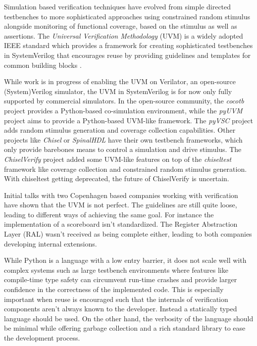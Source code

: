 \documentclass[11pt]{article}
\begin{document}
Simulation based verification techniques have evolved from simple directed testbenches to more sophisticated approaches using constrained random stimulus alongside monitoring of functional coverage, based on the stimulus as well as assertions. 
The \textit{Universal Verification Methodology} (UVM) is a widely adopted IEEE standard which provides a framework for creating sophisticated testbenches in SystemVerilog that encourages reuse by providing guidelines and templates for common building blocks \cite{flake2020a}. 

While work is in progress of enabling the UVM on Verilator, an open-source (System)Verilog simulator, the UVM in SystemVerilog is for now only fully supported by commercial simulators.
In the open-source community, the \textit{cocotb} project provides a Python-based co-simulation environment, while the \textit{pyUVM} project aims to provide a Python-based UVM-like framework. The \textit{pyVSC} project adds random stimulus generation and coverage collection capabilities. Other projects like \textit{Chisel} or \textit{SpinalHDL} have their own testbench frameworks, which only provide barebones means to control a simulation and drive stimulus. The \textit{ChiselVerify} project added some UVM-like features on top of the \textit{chiseltest} framework like coverage collection and constrained random stimulus generation. With chiseltest getting deprecated, the future of ChiselVerify is uncertain.

Initial talks with two Copenhagen based companies working with verification have shown that the UVM is not perfect. The guidelines are still quite loose, leading to different ways of achieving the same goal. For instance the implementation of a scoreboard isn't standardized. The Register Abstraction Layer (RAL) wasn't received as being complete either, leading to both companies developing internal extensions.

While Python is a language with a low entry barrier, it does not scale well with complex systems such as large testbench environments where features like compile-time type safety can circumvent run-time crashes and provide larger confidence in the correctness of the implemented code. This is especially important when reuse is encouraged such that the internals of verification components aren't always known to the developer. Instead a statically typed language should be used. On the other hand, the verbosity of the language should be minimal while offering garbage collection and a rich standard library to ease the development process. 
\end{document}
